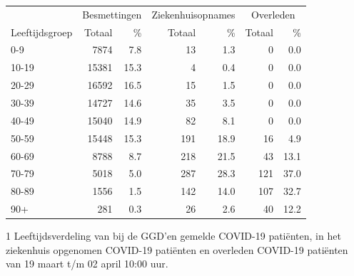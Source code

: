 \documentclass[
  english,
  man,floatsintext]{apa6}
\begin{document}
\begin{table}
\centering\begingroup\fontsize{11}{13}\selectfont

\begin{threeparttable}
\begin{tabular}{lrrrrrr}
\toprule
\multicolumn{1}{c}{ } & \multicolumn{2}{c}{Besmettingen} & \multicolumn{2}{c}{Ziekenhuisopnames} & \multicolumn{2}{c}{Overleden} \\
\cmidrule(l{3pt}r{3pt}){2-3} \cmidrule(l{3pt}r{3pt}){4-5} \cmidrule(l{3pt}r{3pt}){6-7}
Leeftijdsgroep & Totaal & \% & Totaal & \% & Totaal & \%\\
\midrule
0-9 & 7874 & 7.8 & 13 & 1.3 & 0 & 0.0\\
10-19 & 15381 & 15.3 & 4 & 0.4 & 0 & 0.0\\
20-29 & 16592 & 16.5 & 15 & 1.5 & 0 & 0.0\\
30-39 & 14727 & 14.6 & 35 & 3.5 & 0 & 0.0\\
40-49 & 15040 & 14.9 & 82 & 8.1 & 0 & 0.0\\
50-59 & 15448 & 15.3 & 191 & 18.9 & 16 & 4.9\\
60-69 & 8788 & 8.7 & 218 & 21.5 & 43 & 13.1\\
70-79 & 5018 & 5.0 & 287 & 28.3 & 121 & 37.0\\
80-89 & 1556 & 1.5 & 142 & 14.0 & 107 & 32.7\\
90+ & 281 & 0.3 & 26 & 2.6 & 40 & 12.2\\
\bottomrule
\end{tabular}
\begin{tablenotes}
\item[1] Leeftijdsverdeling van bij de GGD’en gemelde COVID-19 patiënten, in het ziekenhuis opgenomen COVID-19 patiënten en overleden COVID-19 patiënten van 19 maart t/m 02 april 10:00 uur.
\end{tablenotes}
\end{threeparttable}
\endgroup{}
\end{table}

\newpage
\end{document}
